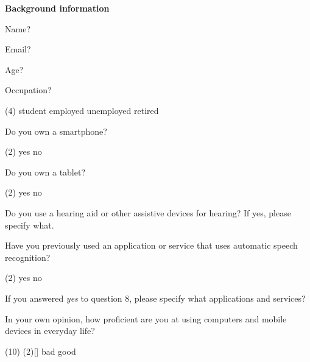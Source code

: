 \documentclass[english, 12pt, a4paper, pdftex, elec, utf8]{aaltothesis}
\begin{document}
{ \footnotesize %
	\noindent
	\hspace{0.35cm}
	\textbf{Background information}
	\vspace{0.15cm} 
	\begin{questionnaire}
		\item Name?
		\item Email?
		\item Age?
		\item Occupation?
		\begin{tasks}[label-width = 2em](4)
			\task student
			\task employed
			\task unemployed
			\task retired
		\end{tasks}
		\item Do you own a smartphone?
		\begin{tasks}[label-width = 2em](2)
			\task yes
			\task no
		\end{tasks}
		\item Do you own a tablet?
		\begin{tasks}[label-width = 2em](2)
			\task yes
			\task no
		\end{tasks}
		\item Do you use a hearing aid or other assistive devices for hearing? If yes, please specify what.
		\item Have you previously used an application or service that uses automatic speech recognition?
		\begin{tasks}[label-width = 2em](2)
			\task yes
			\task no
		\end{tasks}
		\item If you answered \textit{yes} to question 8, please specify what applications and services?
		\item In your own opinion, how proficient are you at using computers and mobile devices in everyday life?
		\begin{tasks}[](10)
			\task*(2)[] bad
			\task[] 1
			\task[] 2
			\task[] 3
			\task[] 4
			\task[] 5
			\task[] 6
			\task[] 7
			\task[] good \\\\

\end{tasks}
\end{questionnaire}}
\end{document}
